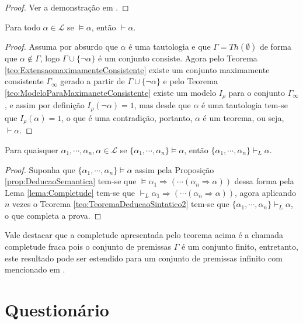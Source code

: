 \begin{proof}
  Ver a demonstração em \cite{joaoPavao2014}.
\end{proof}

\begin{lema}\label{lema:Completude}
  Para todo $\alpha \in \mathcal{L}$ se $\vDash \alpha$, então $\vdash \alpha$.
\end{lema}

\begin{proof}
  Assuma por absurdo que $\alpha$ é uma tautologia e que $\Gamma = Th(\emptyset)$ de forma que $\alpha \notin \Gamma$, logo $\Gamma \cup \{\neg \alpha\}$ é um conjunto consiste. Agora pelo Teorema \ref{teo:ExtensaomaximamenteConsistente} existe um conjunto maximamente consistente $\Gamma_\infty$ gerado a partir de $\Gamma \cup \{\neg \alpha\}$ e pelo Teorema \ref{teo:ModeloParaMaximaneteConsistente} existe um modelo $I_\rho$ para o conjunto $\Gamma_\infty$, e assim por definição $I_\rho(\neg \alpha) = 1$, mas desde que $\alpha$ é uma tautologia tem-se que $I_\rho(\alpha) = 1$, o que é uma contradição, portanto, $\alpha$ é um teorema, ou seja, $\vdash \alpha$.
\end{proof}

\begin{teorema}
  Para quaisquer $\alpha_1, \cdots, \alpha_n, \alpha \in \mathcal{L}$ se $\{\alpha_1, \cdots, \alpha_n\} \vDash \alpha$, então $\{\alpha_1, \cdots, \alpha_n\} \vdash_L \alpha$.
\end{teorema}

\begin{proof}
  Suponha que $\{\alpha_1, \cdots, \alpha_n\} \vDash \alpha$ assim pela Proposição \ref{prop:DeducaoSemantica} tem-se que $\vDash \alpha_1 \Rightarrow ( \cdots ( \alpha_n \Rightarrow \alpha))$ dessa forma pela Lema \ref{lema:Completude} tem-se que $\vdash_L \alpha_1 \Rightarrow ( \cdots ( \alpha_n \Rightarrow \alpha))$, agora aplicando $n$ vezes o Teorema \ref{teo:TeoremaDeducaoSintatico2}  tem-se que $\{\alpha_1, \cdots, \alpha_n\} \vdash_L \alpha$, o que completa a prova.
\end{proof}

Vale destacar que a completude apresentada pelo teorema acima é a chamada completude fraca pois o conjunto de premissas $\Gamma$ é um conjunto finito, entretanto, este resultado pode ser estendido para um conjunto de premissas infinito com mencionado em \cite{joaoPavao2014}.

\section{Questionário}\label{sec:Questionario2part3}

